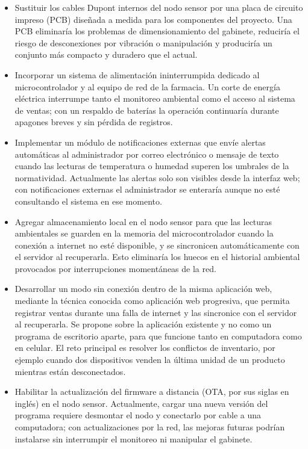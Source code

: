 \begin{itemize}

    \item Sustituir los cables Dupont internos del nodo sensor por una placa de circuito impreso (PCB) diseñada a medida para los componentes del proyecto. Una PCB eliminaría los problemas de dimensionamiento del gabinete, reduciría el riesgo de desconexiones por vibración o manipulación y produciría un conjunto más compacto y duradero que el actual.

    \item Incorporar un sistema de alimentación ininterrumpida dedicado al microcontrolador y al equipo de red de la farmacia. Un corte de energía eléctrica interrumpe tanto el monitoreo ambiental como el acceso al sistema de ventas; con un respaldo de baterías la operación continuaría durante apagones breves y sin pérdida de registros.

    \item Implementar un módulo de notificaciones externas que envíe alertas automáticas al administrador por correo electrónico o mensaje de texto cuando las lecturas de temperatura o humedad superen los umbrales de la normatividad. Actualmente las alertas solo son visibles desde la interfaz web; con notificaciones externas el administrador se enteraría aunque no esté consultando el sistema en ese momento.

    \item Agregar almacenamiento local en el nodo sensor para que las lecturas ambientales se guarden en la memoria del microcontrolador cuando la conexión a internet no esté disponible, y se sincronicen automáticamente con el servidor al recuperarla. Esto eliminaría los huecos en el historial ambiental provocados por interrupciones momentáneas de la red. \newpage

    \item Desarrollar un modo sin conexión dentro de la misma aplicación web, mediante la técnica conocida como aplicación web progresiva, que permita registrar ventas durante una falla de internet y las sincronice con el servidor al recuperarla. Se propone sobre la aplicación existente y no como un programa de escritorio aparte, para que funcione tanto en computadora como en celular. El reto principal es resolver los conflictos de inventario, por ejemplo cuando dos dispositivos venden la última unidad de un producto mientras están desconectados.

    \item Habilitar la actualización del firmware a distancia (OTA, por sus siglas en inglés) en el nodo sensor. Actualmente, cargar una nueva versión del programa requiere desmontar el nodo y conectarlo por cable a una computadora; con actualizaciones por la red, las mejoras futuras podrían instalarse sin interrumpir el monitoreo ni manipular el gabinete.


\end{itemize}
